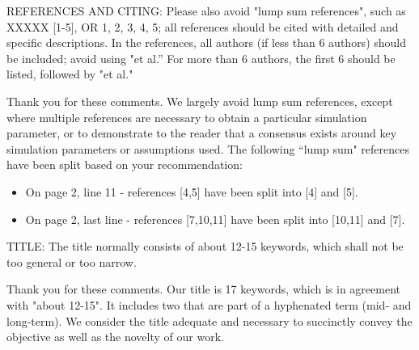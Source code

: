 \documentclass[answers,11pt]{exam}
\begin{document}
\begin{questions}
\begin{solution}
        \end{solution}

    
   \question  
REFERENCES AND CITING: Please also avoid "lump sum references", such as XXXXX [1-5], OR 1, 2, 3, 4, 5; all references should be cited with detailed and specific descriptions.  In the references, all authors (if less than 6 authors) should be included; avoid using "et al.” For more than 6 authors, the first 6 should be listed, followed by "et al."        
        \begin{solution}
                Thank you for these comments. We largely avoid lump sum references, except where multiple references are necessary to obtain a particular simulation parameter, or to demonstrate to the reader that a consensus exists around key simulation parameters or assumptions used. The following ``lump sum" references have been split based on your recommendation:
                \begin{itemize}
                
\item On page 2, line 11 - references [4,5] have been split into [4] and [5].

\item On page 2, last line - references [7,10,11] have been split into [10,11] and [7].
                
                \end{itemize}
                
                
        \end{solution}

 
   \question  
 
TITLE: The title normally consists of about 12-15 keywords, which shall not be too general or too narrow.        
        \begin{solution}
                Thank you for these comments. Our title is 17 keywords, which is in agreement with "about 12-15". It includes two that are part of a hyphenated term (mid- and long-term). We consider the title adequate and necessary to succinctly convey the objective as well as the novelty of our work.
                
        \end{solution}



\end{questions}
\end{document}
